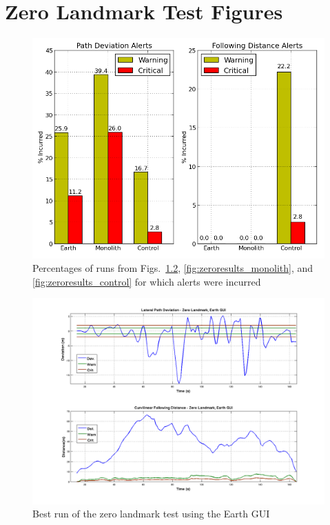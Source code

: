 \chapter{Zero Landmark Test Figures} \label{app:zeroresults}


\begin{figure}[ht] \centering
    \includegraphics[width=6in]{./figs/zero_landmark_alert_percents.png}
    \caption{Percentages of runs from Figs.~\ref{fig:zeroresults_earth}, \ref{fig:zeroresults_monolith}, and \ref{fig:zeroresults_control} for which alerts were incurred}
    \label{fig:zero_alerts}
\end{figure}
\begin{figure}[ht] \centering
    \includegraphics[width=6in]{./figs/zero_landmark_results_dst_dev_earth.png}
    \caption{Best run of the zero landmark test using the Earth GUI} \label{fig:zeroresults_earth}
\end{figure}
